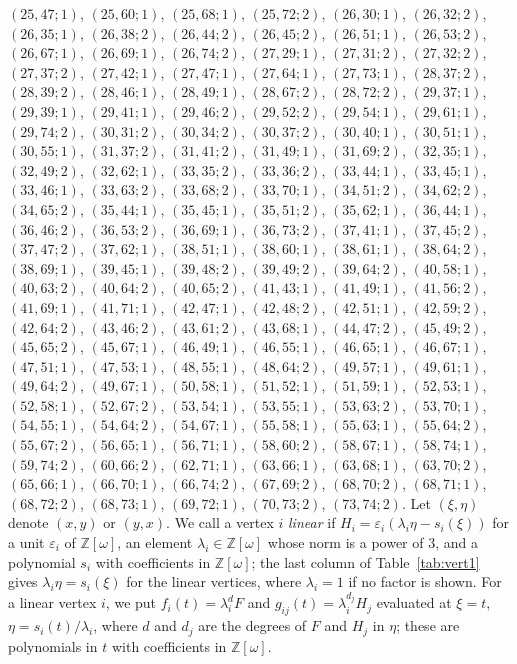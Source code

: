 \documentclass[11pt]{article}
\newcommand{\Z}{\mathbb{Z}}
\begin{document}
$(25,47;1)$, $(25,60;1)$, $(25,68;1)$, $(25,72;2)$, $(26,30;1)$, $(26,32;2)$, $(26,35;1)$, $(26,38;2)$, $(26,44;2)$, $(26,45;2)$, $(26,51;1)$, $(26,53;2)$, $(26,67;1)$, $(26,69;1)$, $(26,74;2)$, $(27,29;1)$, $(27,31;2)$, $(27,32;2)$, $(27,37;2)$, $(27,42;1)$, $(27,47;1)$, $(27,64;1)$, $(27,73;1)$, $(28,37;2)$, $(28,39;2)$, $(28,46;1)$, $(28,49;1)$, $(28,67;2)$, $(28,72;2)$, $(29,37;1)$, $(29,39;1)$, $(29,41;1)$, $(29,46;2)$, $(29,52;2)$, $(29,54;1)$, $(29,61;1)$, $(29,74;2)$, $(30,31;2)$, $(30,34;2)$, $(30,37;2)$, $(30,40;1)$, $(30,51;1)$, $(30,55;1)$, $(31,37;2)$, $(31,41;2)$, $(31,49;1)$, $(31,69;2)$, $(32,35;1)$, $(32,49;2)$, $(32,62;1)$, $(33,35;2)$, $(33,36;2)$, $(33,44;1)$, $(33,45;1)$, $(33,46;1)$, $(33,63;2)$, $(33,68;2)$, $(33,70;1)$, $(34,51;2)$, $(34,62;2)$, $(34,65;2)$, $(35,44;1)$, $(35,45;1)$, $(35,51;2)$, $(35,62;1)$, $(36,44;1)$, $(36,46;2)$, $(36,53;2)$, $(36,69;1)$, $(36,73;2)$, $(37,41;1)$, $(37,45;2)$, $(37,47;2)$, $(37,62;1)$, $(38,51;1)$, $(38,60;1)$, $(38,61;1)$, $(38,64;2)$, $(38,69;1)$, $(39,45;1)$, $(39,48;2)$, $(39,49;2)$, $(39,64;2)$, $(40,58;1)$, $(40,63;2)$, $(40,64;2)$, $(40,65;2)$, $(41,43;1)$, $(41,49;1)$, $(41,56;2)$, $(41,69;1)$, $(41,71;1)$, $(42,47;1)$, $(42,48;2)$, $(42,51;1)$, $(42,59;2)$, $(42,64;2)$, $(43,46;2)$, $(43,61;2)$, $(43,68;1)$, $(44,47;2)$, $(45,49;2)$, $(45,65;2)$, $(45,67;1)$, $(46,49;1)$, $(46,55;1)$, $(46,65;1)$, $(46,67;1)$, $(47,51;1)$, $(47,53;1)$, $(48,55;1)$, $(48,64;2)$, $(49,57;1)$, $(49,61;1)$, $(49,64;2)$, $(49,67;1)$, $(50,58;1)$, $(51,52;1)$, $(51,59;1)$, $(52,53;1)$, $(52,58;1)$, $(52,67;2)$, $(53,54;1)$, $(53,55;1)$, $(53,63;2)$, $(53,70;1)$, $(54,55;1)$, $(54,64;2)$, $(54,67;1)$, $(55,58;1)$, $(55,63;1)$, $(55,64;2)$, $(55,67;2)$, $(56,65;1)$, $(56,71;1)$, $(58,60;2)$, $(58,67;1)$, $(58,74;1)$, $(59,74;2)$, $(60,66;2)$, $(62,71;1)$, $(63,66;1)$, $(63,68;1)$, $(63,70;2)$, $(65,66;1)$, $(66,70;1)$, $(66,74;2)$, $(67,69;2)$, $(68,70;2)$, $(68,71;1)$, $(68,72;2)$, $(68,73;1)$, $(69,72;1)$, $(70,73;2)$, $(73,74;2)$.
Let $(\xi,\eta)$ denote $(x,y)$ or $(y,x)$. We call a vertex $i$ \emph{linear} if $H_i=\varepsilon_i(\lambda_i\eta-s_i(\xi))$ for a unit $\varepsilon_i$ of $\Z[\omega]$, an element $\lambda_i\in\Z[\omega]$ whose norm is a power of $3$, and a polynomial $s_i$ with coefficients in $\Z[\omega]$; the last column of Table~\ref{tab:vert1} gives $\lambda_i\eta=s_i(\xi)$ for the linear vertices, where $\lambda_i=1$ if no factor is shown. For a linear vertex $i$, we put $f_i(t)=\lambda_i^{d}F$ and $g_{ij}(t)=\lambda_i^{d_j}H_j$ evaluated at $\xi=t$, $\eta=s_i(t)/\lambda_i$, where $d$ and $d_j$ are the degrees of $F$ and $H_j$ in $\eta$; these are polynomials in $t$ with coefficients in $\Z[\omega]$.
\end{document}
